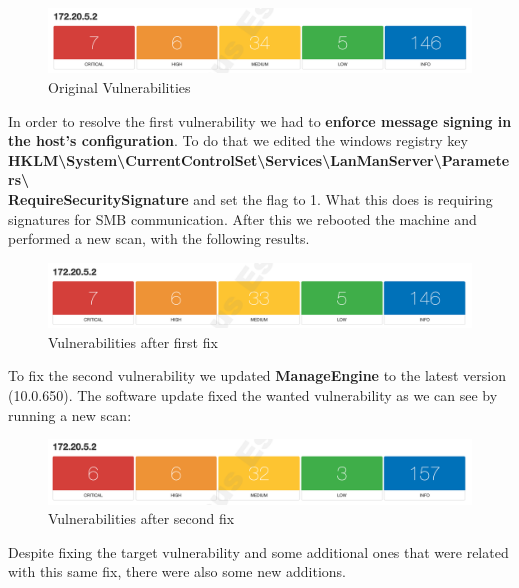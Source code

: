 \begin{figure}[ht!]
 	\centering
 	\includegraphics[width=1\linewidth]{img/vuln0.png}
 	\caption{Original Vulnerabilities}
\end{figure}

In order to resolve the first vulnerability we had to \textbf{enforce message signing in the host's configuration}. To do that we edited the windows registry key \textbf{HKLM\textbackslash System\textbackslash CurrentControlSet\textbackslash Services\textbackslash LanManServer\textbackslash Parameters\textbackslash \\RequireSecuritySignature} and set the flag to 1. What this does is requiring signatures for SMB communication. After this we rebooted the machine and performed a new scan, with the following results.

\begin{figure}[ht!]
 	\centering
 	\includegraphics[width=1\linewidth]{img/vuln2.png}
 	\caption{Vulnerabilities after first fix}
\end{figure}

To fix the second vulnerability we updated \textbf{ManageEngine} to the latest version (10.0.650). The software update fixed the wanted vulnerability as we can see by running a new scan:

\begin{figure}[ht!]
 	\centering
 	\includegraphics[width=1\linewidth]{img/vuln3.png}
 	\caption{Vulnerabilities after second fix}
\end{figure}

\pagebreak

Despite fixing the target vulnerability and some additional ones that were related with this same fix, there were also some new additions.

